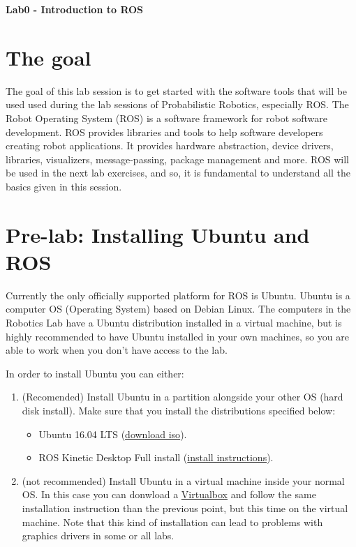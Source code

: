 \documentclass[a4paper,10pt]{article}
\begin{document}
\marginsize{2cm}{2cm}{2cm}{2cm}

\begin{center}
\Large \textbf{Lab0 - Introduction to ROS}
\end{center}

\section{The goal}

The goal of this lab session is to get started with the software tools that will be used used during the lab sessions of Probabilistic Robotics, especially ROS. The Robot Operating System (ROS) is a software framework for robot software development. ROS provides libraries and tools to help software developers creating robot applications. It provides hardware abstraction, device drivers, libraries, visualizers, message-passing, package management and more. ROS will be used in the next lab exercises, and so, it is fundamental to understand all the basics given in this session.

\section{Pre-lab: Installing Ubuntu and ROS}

Currently the only officially supported platform for ROS is Ubuntu. Ubuntu is a computer OS (Operating System) based on Debian Linux. The computers in the Robotics Lab have a Ubuntu distribution installed in a virtual machine, but is highly recommended to have Ubuntu installed in your own machines, so you are able to work when you don't have access to the lab.

In order to install Ubuntu you can either:

\begin{enumerate}
    \item (Recomended) Install Ubuntu in a partition alongside your other OS (hard disk install). Make sure that you install the distributions specified below:
    \begin{itemize}
        \item Ubuntu 16.04 LTS (\href{http://releases.ubuntu.com/16.04/ubuntu-16.04-desktop-amd64.iso}{download iso}).
        \item ROS Kinetic Desktop Full install (\href{http://wiki.ros.org/kinetic/Installation/Ubuntu}{install instructions}).
    \end{itemize}

    \item (not recommended) Install Ubuntu in a virtual machine inside your normal OS. In this case you can donwload a \href{https://www.virtualbox.org/wiki/Linux_Downloads}{Virtualbox}  and follow the same installation instruction than the previous point, but this time on the virtual machine. Note that this kind of installation can lead to problems with graphics drivers in some or all labs.
\end{enumerate}
\end{document}
